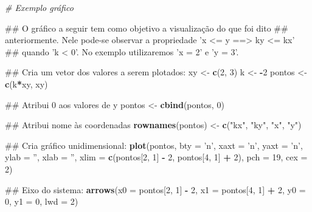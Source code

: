 \documentclass[]{book}
\newenvironment{Shaded}{\begin{snugshade}}{\end{snugshade}}
\newcommand{\KeywordTok}[1]{\textcolor[rgb]{0.13,0.29,0.53}{\textbf{#1}}}
\newcommand{\DataTypeTok}[1]{\textcolor[rgb]{0.13,0.29,0.53}{#1}}
\newcommand{\DecValTok}[1]{\textcolor[rgb]{0.00,0.00,0.81}{#1}}
\newcommand{\StringTok}[1]{\textcolor[rgb]{0.31,0.60,0.02}{#1}}
\newcommand{\CommentTok}[1]{\textcolor[rgb]{0.56,0.35,0.01}{\textit{#1}}}
\newcommand{\OperatorTok}[1]{\textcolor[rgb]{0.81,0.36,0.00}{\textbf{#1}}}
\newcommand{\NormalTok}[1]{#1}
\begin{document}
\begin{Shaded}
\begin{Highlighting}[]
\CommentTok{# Exemplo gráfico}

\NormalTok{##  O gráfico a seguir tem como objetivo a visualização do que foi dito}
\NormalTok{## anteriormente. Nele pode-se observar a propriedade 'x <= y  ==>  ky <= kx'}
\NormalTok{## quando 'k < 0'. No exemplo utilizaremos 'x = 2' e 'y = 3'.}

\NormalTok{## Cria um vetor dos valores a serem plotados:}
\NormalTok{xy <-}\StringTok{ }\KeywordTok{c}\NormalTok{(}\DecValTok{2}\NormalTok{, }\DecValTok{3}\NormalTok{)}
\NormalTok{k <-}\StringTok{ }\OperatorTok{-}\DecValTok{2}
\NormalTok{pontos <-}\StringTok{ }\KeywordTok{c}\NormalTok{(k}\OperatorTok{*}\NormalTok{xy, xy)}

\NormalTok{## Atribui 0 aos valores de y}
\NormalTok{pontos <-}\StringTok{ }\KeywordTok{cbind}\NormalTok{(pontos, }\DecValTok{0}\NormalTok{)}

\NormalTok{## Atribui nome às coordenadas}
\KeywordTok{rownames}\NormalTok{(pontos) <-}\StringTok{ }\KeywordTok{c}\NormalTok{(}\StringTok{"kx"}\NormalTok{, }\StringTok{"ky"}\NormalTok{, }\StringTok{"x"}\NormalTok{, }\StringTok{"y"}\NormalTok{)}

\NormalTok{## Cria gráfico unidimensional:}
\KeywordTok{plot}\NormalTok{(pontos, }\DataTypeTok{bty =} \StringTok{'n'}\NormalTok{, }\DataTypeTok{xaxt =} \StringTok{'n'}\NormalTok{, }\DataTypeTok{yaxt =} \StringTok{'n'}\NormalTok{, }\DataTypeTok{ylab =} \StringTok{''}\NormalTok{, }\DataTypeTok{xlab =} \StringTok{''}\NormalTok{,}
     \DataTypeTok{xlim =} \KeywordTok{c}\NormalTok{(pontos[}\DecValTok{2}\NormalTok{, }\DecValTok{1}\NormalTok{] }\OperatorTok{-}\StringTok{ }\DecValTok{2}\NormalTok{, pontos[}\DecValTok{4}\NormalTok{, }\DecValTok{1}\NormalTok{] }\OperatorTok{+}\StringTok{ }\DecValTok{2}\NormalTok{), }\DataTypeTok{pch =} \DecValTok{19}\NormalTok{, }\DataTypeTok{cex =} \DecValTok{2}\NormalTok{)}

\NormalTok{## Eixo do sistema:}
\KeywordTok{arrows}\NormalTok{(}\DataTypeTok{x0 =}\NormalTok{ pontos[}\DecValTok{2}\NormalTok{, }\DecValTok{1}\NormalTok{] }\OperatorTok{-}\StringTok{ }\DecValTok{2}\NormalTok{, }\DataTypeTok{x1 =}\NormalTok{ pontos[}\DecValTok{4}\NormalTok{, }\DecValTok{1}\NormalTok{] }\OperatorTok{+}\StringTok{ }\DecValTok{2}\NormalTok{,}
       \DataTypeTok{y0 =} \DecValTok{0}\NormalTok{, }\DataTypeTok{y1 =} \DecValTok{0}\NormalTok{, }\DataTypeTok{lwd =} \DecValTok{2}\NormalTok{)}


\end{Highlighting}
\end{Shaded}
\end{document}
